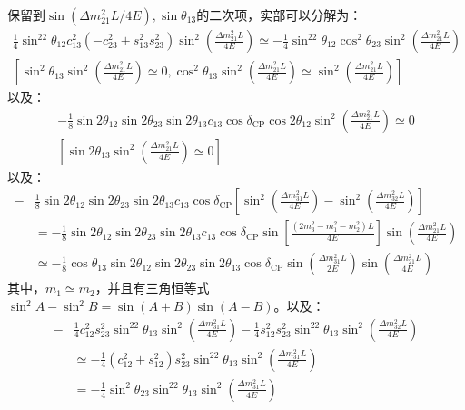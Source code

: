 \documentclass{article}
\begin{document}
	保留到$\sin(\Delta m_{21}^2L/4E),\sin\theta_{13}$的二次项，实部可以分解为：
	\begin{gather*}
		\frac{1}{4}\sin^22\theta_{12}c_{13}^2(-c_{23}^2+s_{13}^2s_{23}^2)\sin^2\left(\frac{\Delta m_{21}^2L}{4E}\right)
			\simeq-\frac{1}{4}\sin^22\theta_{12}\cos^2\theta_{23}\sin^2\left(\frac{\Delta m_{21}^2L}{4E}\right)\\
					\left[\sin^2\theta_{13}\sin^2\left(\frac{\Delta m_{21}^2L}{4E}\right)\simeq 0,\cos^2\theta_{13}\sin^2\left(\frac{\Delta m_{21}^2L}{4E}\right)\simeq\sin^2\left(\frac{\Delta m_{21}^2L}{4E}\right)\right]
	\end{gather*}
	以及：
	\begin{gather*}
		-\frac{1}{8}\sin2\theta_{12}\sin2\theta_{23}\sin2\theta_{13}c_{13}\cos\delta_{\mathrm{CP}}\cos2\theta_{12}\sin^2\left(\frac{\Delta m_{21}^2L}{4E}\right)\simeq 0\\
		\left[\sin2\theta_{13}\sin^2\left(\frac{\Delta m_{21}^2L}{4E}\right)\simeq0\right]
	\end{gather*}
	以及：
	\begin{equation*}
		\begin{aligned}
			-&\frac{1}{8}\sin2\theta_{12}\sin2\theta_{23}\sin2\theta_{13}c_{13}\cos\delta_\mathrm{CP}\left[\sin^2\left(\frac{\Delta m_{31}^2L}{4E}\right)-\sin^2\left(\frac{\Delta m_{32}^2L}{4E}\right)\right]\\
				&=-\frac{1}{8}\sin2\theta_{12}\sin2\theta_{23}\sin2\theta_{13}c_{13}\cos\delta_\mathrm{CP}\sin\left[\frac{(2m_3^2-m_1^2-m_2^2)L}{4E}\right]\sin\left(\frac{\Delta m_{21}^2L}{4E}\right)\\
					&\simeq-\frac{1}{8}\cos\theta_{13}\sin2\theta_{12}\sin2\theta_{23}\sin2\theta_{13}\cos\delta_\mathrm{CP}\sin\left(\frac{\Delta m_{31}^2L}{2E}\right)\sin\left(\frac{\Delta m_{21}^2L}{4E}\right)
		\end{aligned}
	\end{equation*}
	其中，$m_1\simeq m_2$，并且有三角恒等式$\sin^2A-\sin^2B=\sin(A+B)\sin(A-B)$。以及：
	\begin{equation*}
		\begin{aligned}
			-&\frac{1}{4}c_{12}^2s_{23}^2\sin^22\theta_{13}\sin^2\left(\frac{\Delta m_{31}^2L}{4E}\right)-\frac{1}{4}s_{12}^2s_{23}^2\sin^22\theta_{13}\sin^2\left(\frac{\Delta m_{32}^2L}{4E}\right)\\
		&\simeq-\frac{1}{4}(c_{12}^2+s_{12}^2)s_{23}^2\sin^22\theta_{13}\sin^2\left(\frac{\Delta m_{31}^2L}{4E}\right)\\
		&=-\frac{1}{4}\sin^2\theta_{23}\sin^22\theta_{13}\sin^2\left(\frac{\Delta m_{31}^2L}{4E}\right)
		\end{aligned}
	\end{equation*}	
\end{document}
